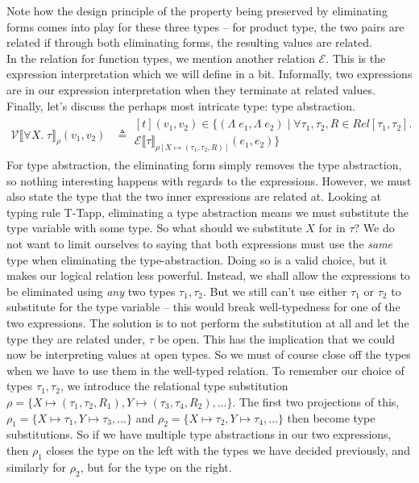 \documentclass[twoside,11pt,openright]{report}
\theoremstyle{definition}
\newcommand{\expr}{e}
\newcommand{\val}{v}
\newcommand{\Tvar}{X}
\newcommand{\TvarB}{Y}
\newcommand{\Tlam}{\Lambda\;}
\newcommand{\Tall}[2]{\forall #1.\; #2}
\newcommand{\typ}{\tau}
\newcommand{\ValInp}[2]{\mathcal{V} \llbracket #1 \rrbracket_{#2}}
\newcommand{\ValInpGen}[2]{\ValInp{#1}{#2}(\val_1, \val_2)}
\newcommand{\ExpInp}[2]{\mathcal{E} \llbracket #1 \rrbracket_{#2}}
\newcommand{\map}[2]{#1 \mapsto #2}
\begin{document}
Note how the design principle of the property being preserved by eliminating forms comes into play for these three types – for product type, the two pairs are related if through both eliminating forms, the resulting values are related.\\
In the relation for function types, we mention another relation $\mathcal{E}$. This is the expression interpretation which we will define in a bit. Informally, two expressions are in our expression interpretation when they terminate at related values.\\
Finally, let's discuss the perhaps most intricate type: type abstraction.
\begin{align*}
  \ValInpGen{\Tall{\Tvar}{\typ}}{\rho}  &\triangleq 
  \begin{aligned}[t]
    (\val_1, \val_2) \in \{(\Tlam \expr_1, \Tlam \expr_2) \mid \forall \typ_1, \typ_2, R \in Rel[\typ_1, \typ_2] .\\
    \ExpInp{\typ}{\rho[\map{\Tvar}{(\typ_1, \typ_2, R)}]}(\expr_1, \expr_2)\}
  \end{aligned}
\end{align*}
For type abstraction, the eliminating form simply removes the type abstraction, so nothing interesting happens with regards to the expressions. However, we must also state the type that the two inner expressions are related at. Looking at typing rule T-Tapp, eliminating a type abstraction means we must substitute the type variable with some type. So what should we substitute $\Tvar$ for in $\typ$? We do not want to limit ourselves to saying that both expressions must use the \textit{same} type when eliminating the type-abstraction. Doing so is a valid choice, but it makes our logical relation less powerful. Instead, we shall allow the expressions to be eliminated using \textit{any} two types $\typ_1, \typ_2$. But we still can't use either $\typ_1$ or $\typ_2$ to substitute for the type variable – this would break well-typedness for one of the two expressions. The solution is to not perform the substitution at all and let the type they are related under, $\typ$ be open. This has the implication that we could now be interpreting values at open types. So we must of course close off the types when we have to use them in the well-typed relation. To remember our choice of types $\typ_1, \typ_2$, we introduce the relational type substitution $\rho = \{\Tvar \mapsto (\typ_1, \typ_2, R_1), \TvarB \mapsto (\typ_3, \typ_4, R_2), \dots\}$. The first two projections of this, $\rho_1 = \{\Tvar \mapsto \typ_1, \TvarB \mapsto \typ_3, \dots\}$ and $\rho_2 = \{\Tvar \mapsto \typ_2, \TvarB \mapsto \typ_4, \dots \}$ then become type substitutions. So if we have multiple type abstractions in our two expressions, then $\rho_1$ closes the type on the left with the types we have decided previously, and similarly for $\rho_2$, but for the type on the right.\\
\end{document}
